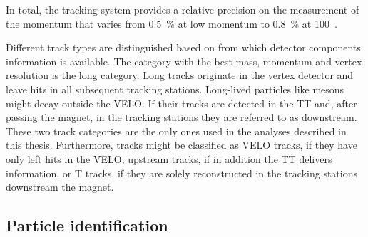 In total, the tracking system provides a relative precision on the measurement
of the momentum that varies from \SI{0.5}{\percent} at low momentum to
\SI{0.8}{\percent} at \SI{100}{\gevc}~\cite{LHCb-DP-2014-002}.

Different track types are distinguished based on from which detector
components information is available. The category with the best mass, momentum
and vertex resolution is the long category. Long tracks originate in the
vertex detector and leave hits in all subsequent tracking stations. Long-lived
particles like \KS mesons might decay outside the VELO. If their tracks are
detected in the TT and, after passing the magnet, in the tracking stations
they are referred to as downstream. These two track categories are the only
ones used in the analyses described in this thesis. Furthermore, tracks might
be classified as VELO tracks, if they have only left hits in the VELO,
upstream tracks, if in addition the TT delivers information, or T tracks, if
they are solely reconstructed in the tracking stations downstream the magnet.


\subsection*{Particle identification}
\label{subsec:teilchenidentifizierung}

